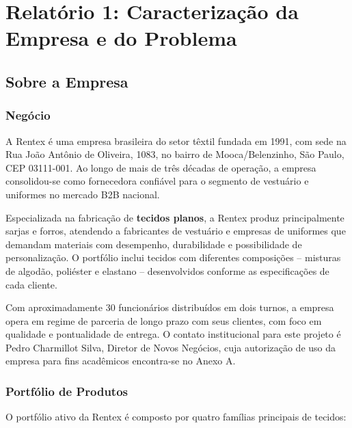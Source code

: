 
\section{Relatório 1: Caracterização da Empresa e do Problema}

\subsection{Sobre a Empresa}

\subsubsection{Negócio}

A Rentex é uma empresa brasileira do setor têxtil fundada em 1991, com sede na
Rua João Antônio de Oliveira, 1083, no bairro de Mooca/Belenzinho, São Paulo,
CEP 03111-001. Ao longo de mais de três décadas de operação, a empresa
consolidou-se como fornecedora confiável para o segmento de vestuário e uniformes
no mercado B2B nacional.

Especializada na fabricação de \textbf{tecidos planos}, a Rentex produz principalmente
sarjas e forros, atendendo a fabricantes de vestuário e empresas de uniformes que
demandam materiais com desempenho, durabilidade e possibilidade de personalização.
O portfólio inclui tecidos com diferentes composições -- misturas de algodão,
poliéster e elastano -- desenvolvidos conforme as especificações de cada cliente.

Com aproximadamente 30 funcionários distribuídos em dois turnos, a empresa opera
em regime de parceria de longo prazo com seus clientes, com foco em qualidade e
pontualidade de entrega. O contato institucional para este projeto é Pedro
Charmillot Silva, Diretor de Novos Negócios, cuja autorização de uso da empresa
para fins acadêmicos encontra-se no Anexo A.

\subsubsection{Portfólio de Produtos}

O portfólio ativo da Rentex é composto por quatro famílias principais de tecidos:

